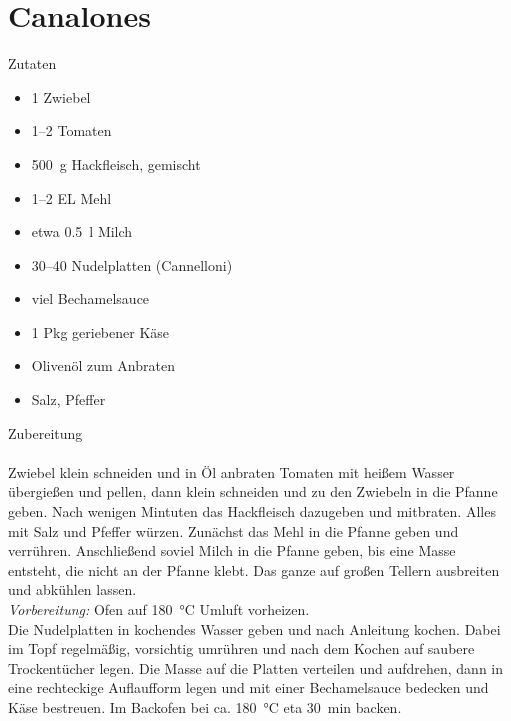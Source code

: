 \section*{Canalones}
\ihead{}\ohead{}
\cfoot{}
{\Large Zutaten}
\begin{multicols}{2}
\begin{itemize}
    \item \num{1} Zwiebel
    \item \numrange{1}{2} Tomaten
    \item \SI{500}{g} Hackfleisch, gemischt
    \item \numrange{1}{2} EL Mehl
    \item etwa \SI{0.5}{l} Milch 
    \item \numrange{30}{40} Nudelplatten (Cannelloni)
    \item viel Bechamelsauce
    \item \num{1} Pkg geriebener Käse
    \item Olivenöl zum Anbraten
    \item Salz, Pfeffer
\end{itemize}
\end{multicols}
\noindent
{\Large Zubereitung}\\
\\
Zwiebel klein schneiden und in Öl anbraten
Tomaten mit heißem Wasser übergießen und pellen, dann klein schneiden und zu den Zwiebeln in die Pfanne geben.
Nach wenigen Mintuten das Hackfleisch dazugeben und mitbraten.
Alles mit Salz und Pfeffer würzen.
Zunächst das Mehl in die Pfanne geben und verrühren. 
Anschließend soviel Milch in die Pfanne geben, bis eine Masse entsteht, die nicht an der Pfanne klebt.
Das ganze auf großen Tellern ausbreiten und abkühlen lassen.\\
\textit{Vorbereitung:} Ofen auf \SI{180}{\celsius} Umluft vorheizen.\\
Die Nudelplatten in kochendes Wasser geben und nach Anleitung kochen. 
Dabei im Topf regelmäßig, vorsichtig umrühren und nach dem Kochen auf saubere Trockentücher legen.
Die Masse auf die Platten verteilen und aufdrehen, dann in eine rechteckige Auflaufform legen und mit einer Bechamelsauce bedecken und Käse bestreuen.
Im Backofen bei ca. \SI{180}{\celsius} eta \SI{30}{min} backen.

